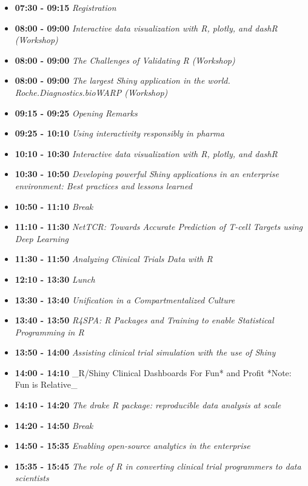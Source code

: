 \documentclass[]{book}
\providecommand{\tightlist}{%
  \setlength{\itemsep}{0pt}\setlength{\parskip}{0pt}}
\theoremstyle{definition}
\theoremstyle{definition}
\theoremstyle{definition}
\theoremstyle{remark}
\begin{document}
\begin{itemize}
\tightlist
\item
  \textbf{07:30 - 09:15} \emph{Registration}
\item
  \textbf{08:00 - 09:00} \emph{Interactive data visualization with R,
  plotly, and dashR (Workshop)}
\item
  \textbf{08:00 - 09:00} \emph{The Challenges of Validating R
  (Workshop)}
\item
  \textbf{08:00 - 09:00} \emph{The largest Shiny application in the
  world. Roche.Diagnostics.bioWARP (Workshop)}
\item
  \textbf{09:15 - 09:25} \emph{Opening Remarks}
\item
  \textbf{09:25 - 10:10} \emph{Using interactivity responsibly in
  pharma}
\item
  \textbf{10:10 - 10:30} \emph{Interactive data visualization with R,
  plotly, and dashR}
\item
  \textbf{10:30 - 10:50} \emph{Developing powerful Shiny applications in
  an enterprise environment: Best practices and lessons learned}
\item
  \textbf{10:50 - 11:10} \emph{Break}
\item
  \textbf{11:10 - 11:30} \emph{NetTCR: Towards Accurate Prediction of
  T-cell Targets using Deep Learning}
\item
  \textbf{11:30 - 11:50} \emph{Analyzing Clinical Trials Data with R}
\item
  \textbf{12:10 - 13:30} \emph{Lunch}
\item
  \textbf{13:30 - 13:40} \emph{Unification in a Compartmentalized
  Culture}
\item
  \textbf{13:40 - 13:50} \emph{R4SPA: R Packages and Training to enable
  Statistical Programming in R}
\item
  \textbf{13:50 - 14:00} \emph{Assisting clinical trial simulation with
  the use of Shiny}
\item
  \textbf{14:00 - 14:10} \_R/Shiny Clinical Dashboards For Fun* and
  Profit *Note: Fun is Relative\_
\item
  \textbf{14:10 - 14:20} \emph{The drake R package: reproducible data
  analysis at scale}
\item
  \textbf{14:20 - 14:50} \emph{Break}
\item
  \textbf{14:50 - 15:35} \emph{Enabling open-source analytics in the
  enterprise}
\item
  \textbf{15:35 - 15:45} \emph{The role of R in converting clinical
  trial programmers to data scientists}

\end{itemize}
\end{document}
